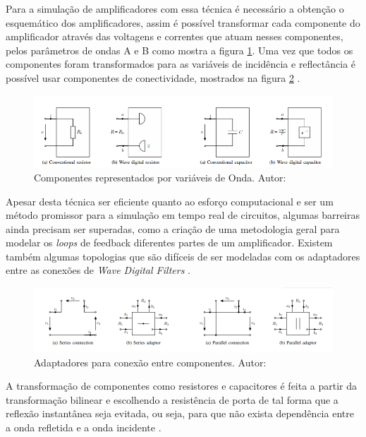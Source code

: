 Para a simulação de amplificadores com essa técnica é necessário a obtenção o esquemático dos amplificadores, assim é possível transformar cada componente do amplificador através das voltagens e correntes que atuam nesses componentes, pelos parâmetros de ondas A e B como mostra a figura \ref{fig:wavedigitalcomponents}\cite{mavcak2012real}. Uma vez que todos os componentes foram transformados para as variáveis de incidência e reflectância é possível usar componentes de conectividade, mostrados na figura \ref{fig:wavedigitaladaptadores} \cite{pakarinen2009review}.

\begin{figure}[!htb]
	\centering
	\includegraphics[width=1.0\linewidth]{figuras/Wavedigitalcomponents}
	\caption{Componentes representados por variáveis de Onda. Autor: \cite{Hotz}}
	\label{fig:wavedigitalcomponents}
\end{figure}



Apesar desta técnica ser eficiente quanto ao esforço computacional e ser um método promissor para a simulação em tempo real de circuitos, algumas barreiras ainda precisam ser superadas, como a criação de uma metodologia geral para modelar os \textit{loops} de feedback diferentes partes de um amplificador. Existem também algumas topologias que são difíceis de ser modeladas com os adaptadores entre as conexões de \textit{Wave Digital Filters} \cite{pakarinen2009review}.

\begin{figure}[!htb]
	\centering
	\includegraphics[width=1.0\linewidth]{figuras/Wavedigitaladaptadores}
	\caption{Adaptadores para conexão entre componentes. Autor: \cite{Hotz}}
	\label{fig:wavedigitaladaptadores}
\end{figure}


A transformação de componentes como resistores e capacitores é feita a partir da transformação bilinear e escolhendo a resistência de porta de tal forma que a reflexão instantânea seja evitada, ou seja, para que não exista dependência entre a onda refletida e a onda incidente \cite{Hotz}.


